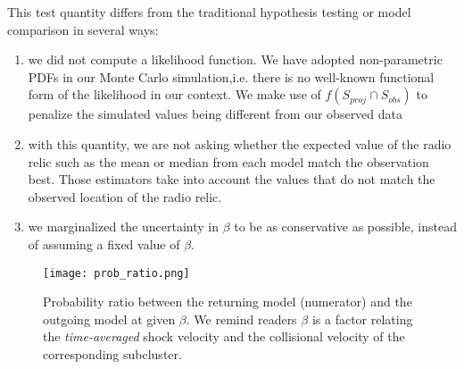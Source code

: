 This test quantity differs from the traditional hypothesis testing or model comparison in several ways: 
\begin{enumerate}
\item we did not compute a likelihood function.  We have adopted
non-parametric PDFs in our Monte Carlo simulation,i.e. there is no well-known
functional form of the likelihood in our context. We make use of
$f(S_{proj} \cap S_{obs})$ to penalize the simulated values being different from our observed data
\item with this quantity, we are not asking whether the expected value of
	the radio relic such as the mean or median from each model match the
	observation best. Those estimators take into account the values that do not match the observed location of the radio relic. 
\item we marginalized the uncertainty in $\beta$ to be as conservative
	as possible, instead of assuming a fixed value of $\beta$.
\end{enumerate} \par

\begin{figure}
	\texttt{[image: prob\_ratio.png]}
	\caption{Probability ratio between the returning model (numerator) and
		the outgoing model at given $\beta$. We remind readers $\beta$ is a factor
		relating the {\it time-averaged} shock velocity and the collisional
		velocity of the corresponding subcluster.  
	\label{fig:prob_ratio}}
\end{figure}

